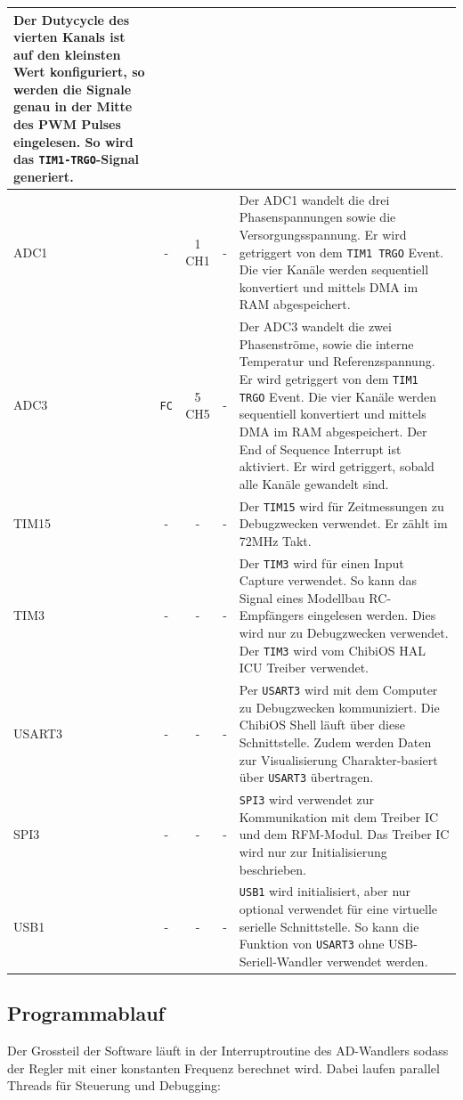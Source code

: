 \begin{tabularx}{\textwidth}{l|c|c|c|X}
	Der Dutycycle des vierten Kanals ist auf den kleinsten Wert konfiguriert, so werden die Signale genau in der Mitte des PWM Pulses eingelesen. So wird das \texttt{TIM1-TRGO}-Signal generiert.
	\\ \hline
	ADC1 &
	- &
	1 CH1 &
	- &
	Der ADC1 wandelt die drei Phasenspannungen sowie die Versorgungsspannung. Er wird getriggert von dem \texttt{TIM1 TRGO} Event. Die vier Kanäle werden sequentiell konvertiert und mittels DMA im RAM abgespeichert.
	\\ \hline
	ADC3 &
	\texttt{FC} &
	5 CH5 &
	- &
	Der ADC3 wandelt die zwei Phasenströme, sowie die interne Temperatur und Referenzspannung. Er wird getriggert von dem \texttt{TIM1 TRGO} Event. Die vier Kanäle werden sequentiell konvertiert und mittels DMA im RAM abgespeichert. Der End of Sequence Interrupt ist aktiviert. Er wird getriggert, sobald alle Kanäle gewandelt sind.
	\\ \hline
	TIM15 &
	- &
	- &
	- &
	Der \texttt{TIM15} wird für Zeitmessungen zu Debugzwecken verwendet. Er zählt im 72MHz Takt.
	\\ \hline
	TIM3 &
	- &
	- &
	- &
	Der \texttt{TIM3} wird für einen Input Capture verwendet. So kann das Signal eines Modellbau RC-Empfängers eingelesen werden. Dies wird nur zu Debugzwecken verwendet. Der \texttt{TIM3} wird vom ChibiOS HAL ICU Treiber verwendet.
	\\ \hline
	USART3 &
	- &
	- &
	- &
	Per \texttt{USART3} wird mit dem Computer zu Debugzwecken kommuniziert. Die ChibiOS Shell läuft über diese Schnittstelle. Zudem werden Daten zur Visualisierung Charakter-basiert über \texttt{USART3} übertragen.
	\\ \hline
	SPI3 &
	- &
	- &
	- &
	\texttt{SPI3} wird verwendet zur Kommunikation mit dem Treiber IC und dem RFM-Modul. Das Treiber IC wird nur zur Initialisierung beschrieben.
	\\ \hline
	USB1 &
	- &
	- &
	- &
	\texttt{USB1} wird initialisiert, aber nur optional verwendet für eine virtuelle serielle Schnittstelle. So kann die Funktion von \texttt{USART3} ohne USB-Seriell-Wandler verwendet werden.
\end{tabularx}
\label{tab:periph}


\subsection*{Programmablauf}
Der Grossteil der Software läuft in der Interruptroutine des AD-Wandlers sodass der Regler mit einer konstanten Frequenz berechnet wird. Dabei laufen parallel Threads für Steuerung und Debugging:\\

